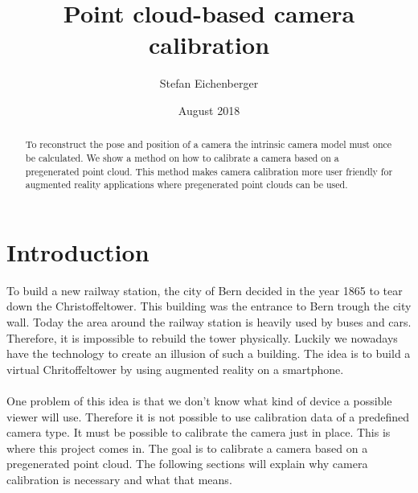 \documentclass[11pt,a4paper,titlepage,oneside]{report}
\title{Point cloud-based camera calibration}
\author{Stefan Eichenberger}
\date{August 2018}
\begin{document}
\maketitle

\begin{abstract}
To reconstruct the pose and position of a camera the intrinsic camera model must once be calculated. We show a method on how to calibrate a camera based on a pregenerated point cloud. This method makes camera calibration more user friendly for augmented reality applications where pregenerated point clouds can be used.
\end{abstract}

\tableofcontents

\chapter{Introduction}
To build a new railway station, the city of Bern decided in the year 1865 to tear down the Christoffeltower. This building was the entrance to Bern trough the city wall. Today the area around the railway station is heavily used by buses and cars. Therefore, it is impossible to rebuild the tower physically. Luckily we nowadays have the technology to create an illusion of such a building. The idea is to build a virtual Chritoffeltower by using augmented reality on a smartphone.\\\\
One problem of this idea is that we don't know what kind of device a possible viewer will use. Therefore it is not possible to use calibration data of a predefined camera type. It must be possible to calibrate the camera just in place. This is where this project comes in. The goal is to calibrate a camera based on a pregenerated point cloud. The following sections will explain why camera calibration is necessary and what that means.
\end{document}
